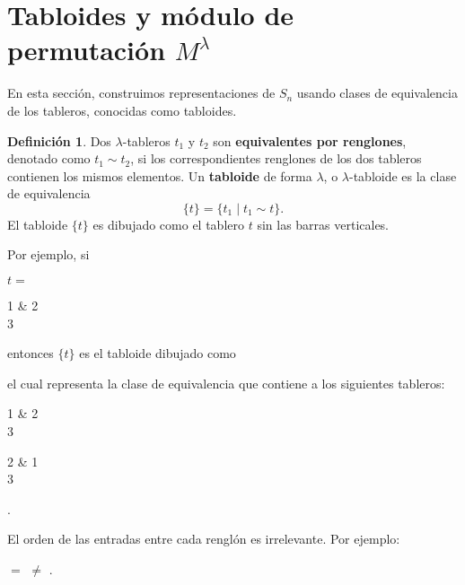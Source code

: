 \documentclass[12pt]{book}
\theoremstyle{definition}
\newtheorem{definition}[theorem]{Definición}
\newcounter{in}
\newcounter{ini}
\begin{document}
\section{Tabloides y módulo de permutación $M^{\lambda}$}
\label{modulo-permutacion}

En esta sección, construimos representaciones de $S_{n}$ usando clases
de equivalencia de los tableros, conocidas como tabloides.

\begin{definition}
  Dos $\lambda$-tableros $t_{1}$ y $t_{2}$ son \textbf{equivalentes
    por renglones}, denotado como $t_{1}\sim t_{2}$, si los
  correspondientes renglones de los dos tableros contienen los mismos
  elementos. Un \textbf{tabloide} de forma $\lambda$, o
  $\lambda$-tabloide es la clase de equivalencia
  $$\{t\}=\{t_{1}\mid t_{1}\sim t\}.$$
  El tabloide $\{t\}$ es dibujado como el tablero $t$ sin las barras
  verticales.
\end{definition}
Por ejemplo, si
\begin{center}
  $t=$
  \begin{ytableau}
    1 & 2  \\
    3
  \end{ytableau}
\end{center}
entonces $\{t\}$ es el tabloide dibujado como

\begin{center}
\end{center}

el cual representa la clase de equivalencia que contiene a los
siguientes tableros:
\begin{center}  
  \begin{ytableau}
    1 & 2  \\
    3
  \end{ytableau}\qquad
  \begin{ytableau}
    2 & 1  \\
    3
  \end{ytableau}\quad .
\end{center}

El orden de las entradas entre cada renglón es irrelevante. Por
ejemplo:

\begin{center}
  \quad$=$\quad
  \quad$\neq$\quad
  \quad .
\end{center}
\end{document}
